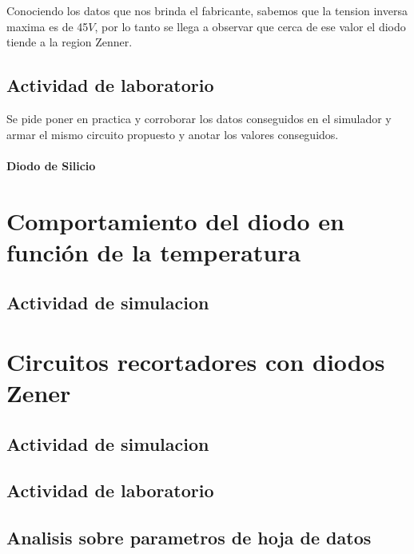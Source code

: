 \documentclass[chaptersright]{informeutn}
\begin{document}
          Conociendo los datos que nos brinda el fabricante, sabemos que la tension inversa maxima es de 45$V$, por lo
          tanto se llega a observar que cerca de ese valor el diodo tiende a la region Zenner.

    \chapter{Actividad de laboratorio}
      Se pide poner en practica y corroborar los datos conseguidos en el simulador y armar el mismo circuito
      propuesto y anotar los valores conseguidos.

        \subsection{Diodo de Silicio}

  \part{Comportamiento del diodo en función de la temperatura}
    \chapter{Actividad de simulacion}
  \part{Circuitos recortadores con diodos Zener}
    \chapter{Actividad de simulacion}
    \chapter{Actividad de laboratorio}
    \chapter{Analisis sobre parametros de hoja de datos}
\end{document}

